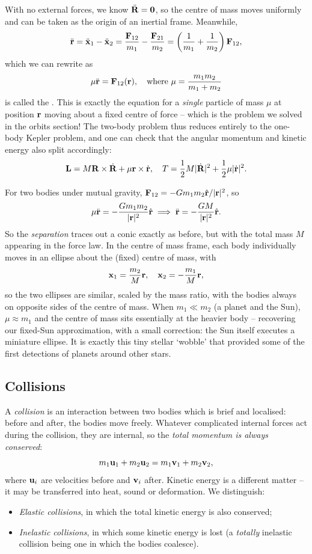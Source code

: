 \documentclass[a4paper]{scrartcl}
\newcommand{\hh}[1]{\hat{\vv{#1}}}
\begin{document}
With no external forces, we know $\ddot{\mathbf{R}} = \mathbf{0}$, so the centre of mass moves uniformly and can be taken as the origin of an inertial frame. Meanwhile,
$$
\ddot{\mathbf{r}} = \ddot{\mathbf{x}}_1 - \ddot{\mathbf{x}}_2 = \frac{\mathbf{F}_{12}}{m_1} - \frac{\mathbf{F}_{21}}{m_2} = \left(\frac{1}{m_1} + \frac{1}{m_2}\right)\mathbf{F}_{12},
$$
which we can rewrite as
$$
\mu \ddot{\mathbf{r}} = \mathbf{F}_{12}(\mathbf{r}), \quad \text{where } \mu = \frac{m_1 m_2}{m_1 + m_2}
$$
is called the . This is exactly the equation for a \emph{single} particle of mass $\mu$ at position $\mathbf{r}$ moving about a fixed centre of force -- which is the problem we solved in the orbits section! The two-body problem thus reduces entirely to the one-body Kepler problem, and one can check that the angular momentum and kinetic energy also split accordingly:
$$
\mathbf{L} = M \mathbf{R} \times \dot{\mathbf{R}} + \mu \mathbf{r} \times \dot{\mathbf{r}}, \quad T = \frac{1}{2}M|\dot{\mathbf{R}}|^2 + \frac{1}{2}\mu |\dot{\mathbf{r}}|^2.
$$

\begin{example}
	For two bodies under mutual gravity, $\vv F_{12} = -Gm_1m_2 \hh r/|\vv r|^2$, so
	$$
	\mu \ddot{\vv r} = -\frac{Gm_1m_2}{|\vv r|^2}\hh r \implies \ddot{\vv r} = -\frac{GM}{|\vv r|^2}\hh r.
	$$
	So the \emph{separation} traces out a conic exactly as before, but with the total mass $M$ appearing in the force law. In the centre of mass frame, each body individually moves in an ellipse about the (fixed) centre of mass, with
	$$
	\mathbf{x}_1 = \frac{m_2}{M}\mathbf{r}, \quad \mathbf{x}_2 = -\frac{m_1}{M}\mathbf{r},
	$$
	so the two ellipses are similar, scaled by the mass ratio, with the bodies always on opposite sides of the centre of mass. When $m_1 \ll m_2$ (a planet and the Sun), $\mu \approx m_1$ and the centre of mass sits essentially at the heavier body -- recovering our fixed-Sun approximation, with a small correction: the Sun itself executes a miniature ellipse. It is exactly this tiny stellar `wobble' that provided some of the first detections of planets around other stars.
\end{example}

\subsection{Collisions}

A \emph{collision} is an interaction between two bodies which is brief and localised: before and after, the bodies move freely. Whatever complicated internal forces act during the collision, they are internal, so the \emph{total momentum is always conserved}:
$$
m_1 \mathbf{u}_1 + m_2 \mathbf{u}_2 = m_1 \mathbf{v}_1 + m_2 \mathbf{v}_2,
$$
where $\mathbf{u}_i$ are velocities before and $\mathbf{v}_i$ after. Kinetic energy is a different matter -- it may be transferred into heat, sound or deformation. We distinguish:
\begin{itemize}
	\item \emph{Elastic collisions}, in which the total kinetic energy is also conserved;
	\item \emph{Inelastic collisions}, in which some kinetic energy is lost (a \emph{totally} inelastic collision being one in which the bodies coalesce).
\end{itemize}
\end{document}
